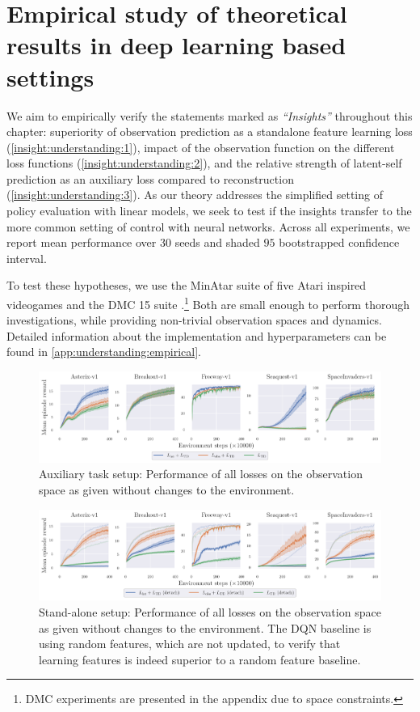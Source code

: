 \section{Empirical study of theoretical results in deep learning based settings}
\label{sec:understanding:empirical}

We aim to empirically verify the statements marked as \emph{``Insights''} throughout this chapter: superiority of observation prediction as a standalone feature learning loss (\autoref{insight:understanding:1}), impact of the observation function on the different loss functions (\autoref{insight:understanding:2}), and the relative strength of latent-self prediction as an auxiliary loss compared to reconstruction (\autoref{insight:understanding:3}). 
As our theory addresses the simplified setting of policy evaluation with linear models, we seek to test if the insights transfer to the more common setting of control with neural networks.
Across all experiments, we report mean performance over 30 seeds and shaded $95$ bootstrapped confidence interval.

To test these hypotheses, we use the MinAtar suite of five Atari inspired videogames \parencite{young19minatar} and the DMC 15 suite  \parencite{tunyasuvunakool2020}.\footnote{DMC experiments are presented in the appendix due to space constraints.}
Both are small enough to perform thorough investigations, while providing non-trivial observation spaces and dynamics.
Detailed information about the implementation and hyperparameters can be found in \autoref{app:understanding:empirical}.


\begin{figure}[b]
    \centering
    \includegraphics[width=\textwidth]{figures/understanding/rlc2024_minatar.pdf}
    \caption{Auxiliary task setup: Performance of all losses on the observation space as given without changes to the environment.}
    \label{fig:understanding:aux}
\end{figure}

\begin{figure}[t]
    \centering
    \includegraphics[width=\textwidth]{figures/understanding/rlc2024-detach_minatar.pdf}
    \caption{Stand-alone setup: Performance of all losses on the observation space as given without changes to the environment. The DQN baseline is using random features, which are not updated, to verify that learning features is indeed superior to a random feature baseline.}
    \label{fig:understanding:sta}
\end{figure}

